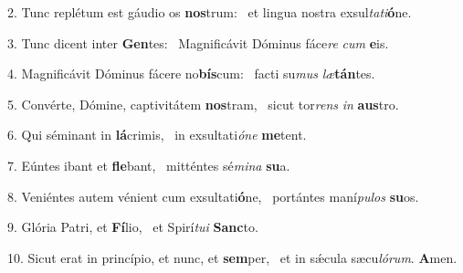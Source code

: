 2. Tunc replétum est gáudio os \textbf{nos}trum: \ast\  et lingua nostra exsul\textit{ta}\textit{ti}\textbf{ó}ne.\

3. Tunc dicent inter \textbf{Gen}tes: \ast\  Magnificávit Dóminus fáce\textit{re} \textit{cum} \textbf{e}is.\

4. Magnificávit Dóminus fácere no\textbf{bís}cum: \ast\  facti su\textit{mus} \textit{læ}\textbf{tán}tes.\

5. Convérte, Dómine, captivitátem \textbf{nos}tram, \ast\  sicut tor\textit{rens} \textit{in} \textbf{aus}tro.\

6. Qui séminant in \textbf{lá}crimis, \ast\  in exsultati\textit{ó}\textit{ne} \textbf{me}tent.\

7. Eúntes ibant et \textbf{fle}bant, \ast\  mitténtes sé\textit{mi}\textit{na} \textbf{su}a.\

8. Veniéntes autem vénient cum exsultati\textbf{ó}ne, \ast\  portántes maní\textit{pu}\textit{los} \textbf{su}os.\

9. Glória Patri, et \textbf{Fí}lio, \ast\  et Spirí\textit{tu}\textit{i} \textbf{Sanc}to.\

10. Sicut erat in princípio, et nunc, et \textbf{sem}per, \ast\  et in sǽcula sæcu\textit{ló}\textit{rum}. \textbf{A}men.\

